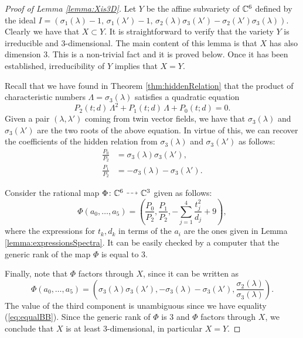 \documentclass[phd,tocprelim]{cornell}
\begin{document}
\begin{proof}[Proof of Lemma \ref*{lemma:Xis3D}]
 Let $Y$ be the affine subvariety of $\mathbb{C}^6$ defined by the ideal $I=( \sigma_1(\lambda)-1,\, \sigma_1(\lambda')-1,\,  \sigma_2(\lambda)\sigma_3(\lambda')-\sigma_2(\lambda')\sigma_3(\lambda) )$. Clearly we have that $X\subset Y$. It is straightforward to verify that the variety $Y$ is irreducible and 3-dimensional. The main content of this lemma is that $X$ has also dimension 3. This is a non-trivial fact and it is proved below. Once it has been established, irreducibility of $Y$ implies that $X=Y$.
 
 Recall that we have found in Theorem \ref{thm:hiddenRelation} that the product of characteristic numbers $\Lambda=\sigma_3(\lambda)$ satisfies a quadratic equation
  \[ P_2(t;d)\,\Lambda^2+P_1(t;d)\,\Lambda+P_0(t;d)=0 . \]
 Given a pair $(\lambda,\lambda')$ coming from twin vector fields, we have that $\sigma_3(\lambda)$ and $\sigma_3(\lambda')$ are the two roots of the above equation. In virtue of this, we can recover the coefficients of the hidden relation from $\sigma_3(\lambda)$ and $\sigma_3(\lambda')$ as follows:
 \begin{align*}
  \frac{P_0}{P_2} &= \sigma_3(\lambda)\sigma_3(\lambda'), \\
  \frac{P_1}{P_2} &= -\sigma_3(\lambda)-\sigma_3(\lambda').
 \end{align*}

 Consider the rational map $\Phi\colon\C^6\dashedArrow\C^3$ given as follows: 
  \[ \Phi(a_0,\ldots,a_5)=\left( \frac{P_0}{P_2}, \frac{P_1}{P_2}, -\sum_{j=1}^4\frac{t_j^2}{d_j} +9 \right), \]
 where the expressions for $t_k,d_k$ in terms of the $a_i$ are the ones given in Lemma \ref{lemma:expressionsSpectra}. It can be easily checked by a computer that the generic rank of the map $\Phi$ is equal to 3.
 
 Finally, note that $\Phi$ factors through $X$, since it can be written as
  \[ \Phi(a_0,\ldots,a_5)=\left( \sigma_3(\lambda)\sigma_3(\lambda'), -\sigma_3(\lambda)-\sigma_3(\lambda'), \frac{\sigma_2(\lambda)}{\sigma_3(\lambda)} \right). \]
 The value of the third component is unambiguous since we have equality (\ref{eq:equalBB}). Since the generic rank of $\Phi$ is 3 and $\Phi$ factors through $X$, we conclude that $X$ is at least 3-dimensional, in particular $X=Y$.  
\end{proof}
\end{document}
